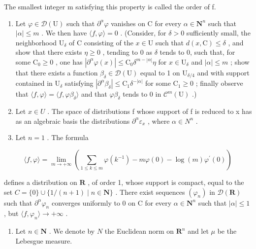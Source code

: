 The smallest integer m satisfying this property is called the order of f.

\begin{enumerate}
\def\labelenumi{\alph{enumi})}
\setcounter{enumi}{1}
\item
  Let \(\varphi \in \mathcal{D}(\mathrm{U})\) such that \(\partial^{\alpha}\varphi\) vanishes on C for every \(\alpha \in \mathbf{N}^{n}\) such that \(|\alpha| \leqslant m\) . We then have \(\langle f, \varphi \rangle = 0\) . (Consider, for \(\delta > 0\) sufficiently small, the neighborhood \(\mathrm{U}_{\delta}\) of C consisting of the \(x \in \mathrm{U}\) such that \(d(x, \mathrm{C}) \leqslant \delta\) , and show that there exists \(\eta \geqslant 0\) , tending to 0 as \(\delta\) tends to 0, such that, for some \(\mathrm{C}_{0} \geqslant 0\) , one has \(|\partial^{\alpha}\varphi(x)| \leqslant \mathrm{C}_{0}\delta^{m-|\alpha|}\eta\) for \(x \in \mathrm{U}_{\delta}\) and \(|\alpha| \leqslant m\) ; show that there exists a function \(\beta_{\delta} \in \mathcal{D}(\mathrm{U})\) equal to 1 on \(\mathrm{U}_{\delta/4}\) and with support contained in \(\mathrm{U}_{\delta}\) satisfying \(|\partial^{\alpha}\beta_{\delta}| \leqslant \mathrm{C}_{1}\delta^{-|\alpha|}\) for some \(\mathrm{C}_{1} \geqslant 0\) ; finally observe that \(\langle f, \varphi \rangle = \langle f, \varphi\beta_{\delta} \rangle\) and that \(\varphi\beta_{\delta}\) tends to 0 in \(\mathcal{C}^{m}(\mathrm{U})\) .)
\item
  Let \(x \in U\) . The space of distributions f whose support of f is reduced to x has as an algebraic basis the distributions \(\partial^{\alpha}\varepsilon_{x}\) , where \(\alpha \in N^{n}\) .
\item
  Let \(n = 1\) . The formula
\end{enumerate}

\[
\langle f, \varphi \rangle = \lim _ {m \rightarrow + \infty} \left(\sum_ {1 \leqslant k \leqslant m} \varphi (k ^ {- 1}) - m \varphi (0) - \log (m) \varphi^ {\prime} (0)\right)
\]

defines a distribution on \(\mathbf{R}\) , of order 1, whose support is compact, equal to the set \(C = \{0\} \cup \{1/(n+1) \mid n \in \mathbf{N}\}\) . There exist sequences \((\varphi_n)\) in \(\mathcal{D}(\mathbf{R})\) such that \(\partial^{\alpha}\varphi_{n}\) converges uniformly to 0 on C for every \(\alpha\in\mathbf{N}^{n}\) such that \(|\alpha|\leqslant1\) , but \(\langle f,\varphi_{n}\rangle\to+\infty\) .

\begin{enumerate}
\def\labelenumi{\arabic{enumi})}
\setcounter{enumi}{24}
\tightlist
\item
  Let \(n \in \mathbf{N}\) . We denote by \(N\) the Euclidean norm on \(\mathbf{R}^n\) and let \(\mu\) be the Lebesgue measure.
\end{enumerate}

